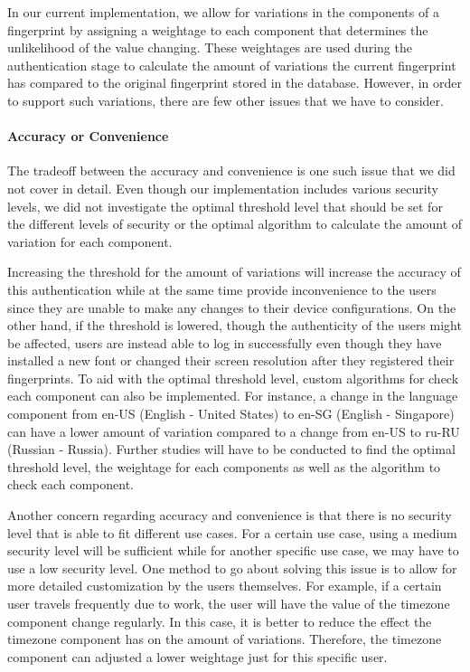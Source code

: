\documentclass{acm_proc_article-sp}
\begin{document}
In our current implementation, we allow for variations in the components of a fingerprint by assigning a weightage to each component that determines the unlikelihood of the value changing. These weightages are used during the authentication stage to calculate the amount of variations the current fingerprint has compared to the original fingerprint stored in the database. However, in order to support such variations, there are few other issues that we have to consider.

\paragraph{Accuracy or Convenience}
The tradeoff between the accuracy and convenience is one such issue that we did not cover in detail. Even though our implementation includes various security levels, we did not investigate the optimal threshold level that should be set for the different levels of security or the optimal algorithm to calculate the amount of variation for each component. 

Increasing the threshold for the amount of variations will increase the accuracy of this authentication while at the same time provide inconvenience to the users since they are unable to make any changes to their device configurations. On the other hand, if the threshold is lowered, though the authenticity of the users might be affected, users are instead able to log in successfully even though they have installed a new font or changed their screen resolution after they registered their fingerprints. To aid with the optimal threshold level, custom algorithms for check each component can also be implemented. For instance, a change in the language component from en-US (English - United States) to en-SG (English - Singapore) can have a lower amount of variation compared to a change from en-US to ru-RU (Russian - Russia). Further studies will have to be conducted to find the optimal threshold level, the weightage for each components as well as the algorithm to check each component.

Another concern regarding accuracy and convenience is that there is no security level that is able to fit different use cases. For a certain use case, using a medium security level will be sufficient while for another specific use case, we may have to use a low security level. One method to go about solving this issue is to allow for more detailed customization by the users themselves. For example, if a certain user travels frequently due to work, the user will have the value of the timezone component change regularly. In this case, it is better to reduce the effect the timezone component has on the amount of variations. Therefore, the timezone component can adjusted a lower weightage just for this specific user.
\end{document}
